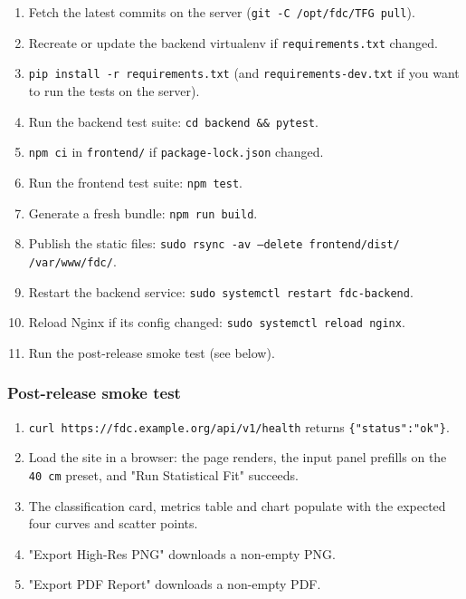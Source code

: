 \documentclass[11pt,a4paper]{article}
\begin{document}
\begin{enumerate}[leftmargin=1.6em]
  \item Fetch the latest commits on the server
        (\texttt{git -C /opt/fdc/TFG pull}).
  \item Recreate or update the backend virtualenv if
        \texttt{requirements.txt} changed.
  \item \texttt{pip install -r requirements.txt} (and
        \texttt{requirements-dev.txt} if you want to run the tests on the
        server).
  \item Run the backend test suite:
        \texttt{cd backend \&\& pytest}.
  \item \texttt{npm ci} in \texttt{frontend/} if \texttt{package-lock.json}
        changed.
  \item Run the frontend test suite: \texttt{npm test}.
  \item Generate a fresh bundle: \texttt{npm run build}.
  \item Publish the static files:
        \texttt{sudo rsync -av --delete frontend/dist/ /var/www/fdc/}.
  \item Restart the backend service:
        \texttt{sudo systemctl restart fdc-backend}.
  \item Reload Nginx if its config changed:
        \texttt{sudo systemctl reload nginx}.
  \item Run the post-release smoke test (see below).
\end{enumerate}

\subsubsection*{Post-release smoke test}
\begin{enumerate}[leftmargin=1.6em]
  \item \texttt{curl https://fdc.example.org/api/v1/health} returns
        \texttt{\{"status":"ok"\}}.
  \item Load the site in a browser: the page renders, the input panel
        prefills on the \texttt{40\,cm} preset, and "Run Statistical Fit"
        succeeds.
  \item The classification card, metrics table and chart populate with the
        expected four curves and scatter points.
  \item "Export High-Res PNG" downloads a non-empty PNG.
  \item "Export PDF Report" downloads a non-empty PDF.
\end{enumerate}
\end{document}
